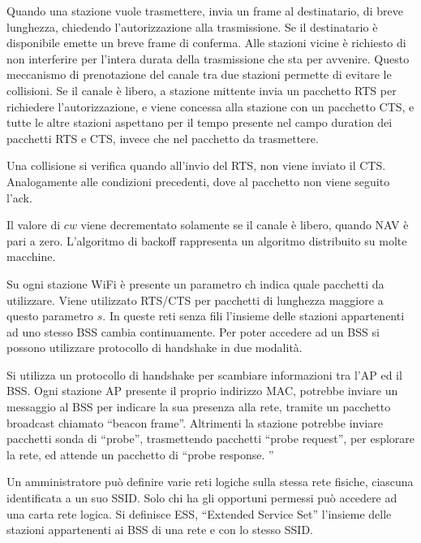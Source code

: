 \documentclass{article}
\numberwithin{equation}{subsection}
\begin{document}
Quando una stazione vuole trasmettere, invia un frame al destinatario, di breve lunghezza, chiedendo l'autorizzazione alla trasmissione. Se il destinatario è disponibile 
emette un breve frame di conferma. Alle stazioni vicine è richiesto di non interferire per l'intera durata della trasmissione che sta per avvenire. Questo 
meccanismo di prenotazione del canale tra due stazioni permette di evitare le collisioni. 
Se il canale è libero, a stazione mittente invia un pacchetto RTS per richiedere l'autorizzazione, e viene concessa alla stazione con un pacchetto CTS, e tutte le altre 
stazioni aspettano per il tempo presente nel campo duration dei pacchetti RTS e CTS, invece che nel pacchetto da trasmettere. 

Una collisione si verifica quando all'invio del RTS, non viene inviato il CTS. Analogamente alle condizioni precedenti, dove al pacchetto non viene seguito l'ack. 



Il valore di $cw$ viene decrementato solamente se il canale è libero, quando NAV è pari a zero. 
L'algoritmo di backoff rappresenta un algoritmo distribuito su molte macchine. 

Su ogni stazione WiFi è presente un parametro ch indica quale pacchetti da utilizzare. Viene utilizzato RTS/CTS per pacchetti di lunghezza maggiore a questo parametro $s$. 
In queste reti senza fili l'insieme delle stazioni appartenenti ad uno stesso BSS cambia continuamente. Per poter accedere ad un BSS si possono utilizzare 
protocollo di handshake in due modalità. 

Si utilizza un protocollo di handshake per scambiare informazioni tra l'AP ed il BSS. Ogni stazione AP presente il proprio indirizzo MAC, potrebbe inviare un messaggio 
al BSS per indicare la sua presenza alla rete, tramite un pacchetto broadcast chiamato ``beacon frame''. 
Altrimenti la stazione potrebbe inviare pacchetti sonda di ``probe'', trasmettendo pacchetti ``probe request'', per esplorare la rete, ed attende un pacchetto di 
``probe response. ''

Un amministratore può definire varie reti logiche sulla stessa rete fisiche, ciascuna identificata a un suo SSID. 
Solo chi ha gli opportuni permessi può accedere ad una carta rete logica. Si definisce ESS, ``Extended Service Set'' l'insieme delle stazioni appartenenti 
ai BSS di una rete e con lo stesso SSID. 
\end{document}
